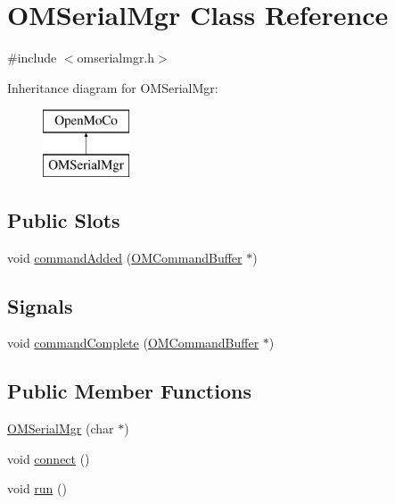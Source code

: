 \hypertarget{class_o_m_serial_mgr}{
\section{OMSerialMgr Class Reference}
\label{class_o_m_serial_mgr}
}


{\ttfamily \#include $<$omserialmgr.h$>$}

Inheritance diagram for OMSerialMgr:\begin{figure}[H]
\begin{center}
\leavevmode
\includegraphics[height=2.000000cm]{class_o_m_serial_mgr}
\end{center}
\end{figure}
\subsection*{Public Slots}
\begin{DoxyCompactItemize}
\item 
void \hyperlink{class_o_m_serial_mgr_af4cad4cb9f1a51d4c843f7b2da2ed438}{commandAdded} (\hyperlink{class_o_m_command_buffer}{OMCommandBuffer} $\ast$)
\end{DoxyCompactItemize}
\subsection*{Signals}
\begin{DoxyCompactItemize}
\item 
void \hyperlink{class_o_m_serial_mgr_a12dd6030d34fb0b5ec83b9fd5adda481}{commandComplete} (\hyperlink{class_o_m_command_buffer}{OMCommandBuffer} $\ast$)
\end{DoxyCompactItemize}
\subsection*{Public Member Functions}
\begin{DoxyCompactItemize}
\item 
\hyperlink{class_o_m_serial_mgr_aaf3e717e0d05702a9490845d146718a6}{OMSerialMgr} (char $\ast$)
\item 
void \hyperlink{class_o_m_serial_mgr_ab1939185db07f5fb4cf73819c776384d}{connect} ()
\item 
void \hyperlink{class_o_m_serial_mgr_aeb0015e25ab9758c1db5c374a2c84612}{run} ()
\end{DoxyCompactItemize}


